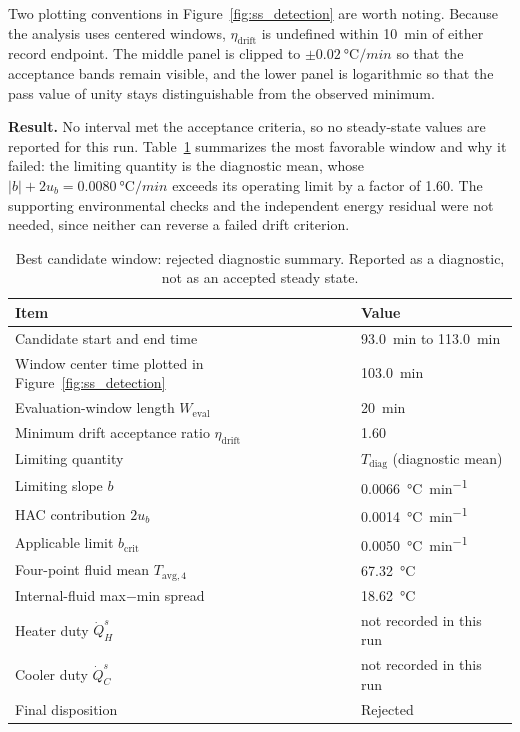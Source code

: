 \documentclass[11pt]{article}
\renewcommand{\arraystretch}{1.18}
\newcommand{\Tavg}{T_{\mathrm{avg},4}}
\newcommand{\Tdiag}{T_{\mathrm{diag}}}
\newcommand{\QHs}{\dot Q_{H}^{s}}
\newcommand{\QCs}{\dot Q_{C}^{s}}
\begin{document}
Two plotting conventions in Figure~\ref{fig:ss_detection} are worth noting.
Because the analysis uses centered windows, $\eta_{\mathrm{drift}}$ is
undefined within \SI{10}{min} of either record endpoint. The middle panel is
clipped to $\pm\SI{0.02}{\degreeCelsius\per min}$ so that the acceptance bands
remain visible, and the lower panel is logarithmic so that the pass value of
unity stays distinguishable from the observed minimum.

\textbf{Result.} No interval met the acceptance criteria, so no steady-state
values are reported for this run. Table~\ref{tab:candidate} summarizes the most
favorable window and why it failed: the limiting quantity is the diagnostic
mean, whose $|b|+2u_b=\SI{0.0080}{\degreeCelsius\per min}$ exceeds its
operating limit by a factor of \num{1.60}. The supporting environmental checks
and the independent energy residual were not needed, since neither can reverse
a failed drift criterion.

\begin{table}[H]
\centering
\caption{Best candidate window: rejected diagnostic summary. Reported as a
diagnostic, not as an accepted steady state.}
\label{tab:candidate}
{\small
\renewcommand{\arraystretch}{1.18}
\begin{tabularx}{0.86\textwidth}{@{}>{\raggedright\arraybackslash}X>{\raggedleft\arraybackslash}p{2.5in}@{}}
\toprule
\textbf{Item} & \textbf{Value} \\
\midrule
Candidate start and end time & \SI{93.0}{min} to \SI{113.0}{min} \\
Window center time plotted in Figure~\ref{fig:ss_detection} & \SI{103.0}{min} \\
Evaluation-window length $W_{\mathrm{eval}}$ & \SI{20}{min} \\
Minimum drift acceptance ratio $\eta_{\mathrm{drift}}$ & \num{1.60} \\
Limiting quantity & $\Tdiag$ (diagnostic mean) \\
Limiting slope $b$ & \SI{+0.0066}{\degreeCelsius\per min} \\
HAC contribution $2u_b$ & \SI{0.0014}{\degreeCelsius\per min} \\
Applicable limit $b_{\mathrm{crit}}$ & \SI{0.0050}{\degreeCelsius\per min} \\
Four-point fluid mean $\Tavg$ & \SI{67.32}{\degreeCelsius} \\
Internal-fluid max$-$min spread & \SI{18.62}{\degreeCelsius} \\
Heater duty $\QHs$ & not recorded in this run \\
Cooler duty $\QCs$ & not recorded in this run \\
Final disposition & Rejected \\
\bottomrule
\end{tabularx}}
\end{table}
\end{document}
